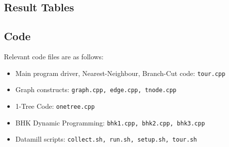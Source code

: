 \documentclass[11pt]{article}
\begin{document}
	\subsection*{Result Tables}
	\subsection*{Code}
	Relevant code files are as follows:
	
	\begin{itemize}
		\item Main program driver, Nearest-Neighbour, Branch-Cut code: \texttt{tour.cpp}
		\item Graph constructs: \texttt{graph.cpp, edge.cpp, tnode.cpp}
		\item 1-Tree Code: \texttt{onetree.cpp}
		\item BHK Dynamic Programming: \texttt{bhk1.cpp, bhk2.cpp, bhk3.cpp}
		\item Datamill scripts: \texttt{collect.sh, run.sh, setup.sh, tour.sh}
	\end{itemize}
	
	
	
\end{document}
